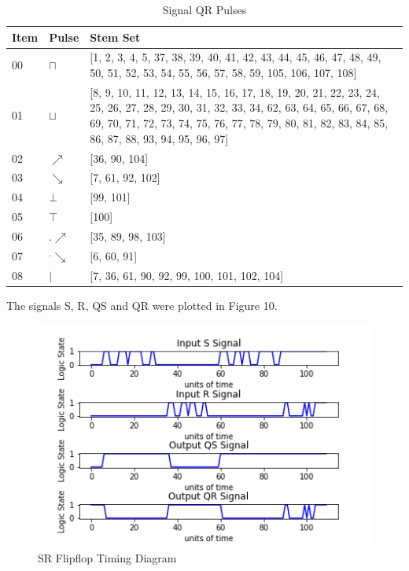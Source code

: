 \documentclass[10pt,journal]{IEEEtran}
\begin{document}
\begin{table}[H] \caption{Signal QR Pulses}\centering\begin{tabular}{|p{.4cm}|p{.5cm}|p{6.5cm}|}\hline Item&Pulse &Stem Set\\ \hline 00& \footnotesize$\sqcap$ & \footnotesize[1, 2, 3, 4, 5, 37, 38, 39, 40, 41, 42, 43, 44, 45, 46, 47, 48, 49, 50, 51, 52, 53, 54, 55, 56, 57, 58, 59, 105, 106, 107, 108]\\ \hline 01& \footnotesize$\sqcup$ & \footnotesize[8, 9, 10, 11, 12, 13, 14, 15, 16, 17, 18, 19, 20, 21, 22, 23, 24, 25, 26, 27, 28, 29, 30, 31, 32, 33, 34, 62, 63, 64, 65, 66, 67, 68, 69, 70, 71, 72, 73, 74, 75, 76, 77, 78, 79, 80, 81, 82, 83, 84, 85, 86, 87, 88, 93, 94, 95, 96, 97]\\ \hline 02& \footnotesize$\nearrow$ & \footnotesize[36, 90, 104]\\ \hline 03& \footnotesize$\searrow$ & \footnotesize[7, 61, 92, 102]\\ \hline 04& \footnotesize$\bot$ & \footnotesize[99, 101]\\ \hline 05& \footnotesize$\top$ & \footnotesize[100]\\ \hline 06& \footnotesize$.\nearrow$ & \footnotesize[35, 89, 98, 103]\\ \hline 07& \footnotesize$^.\searrow$ & \footnotesize[6, 60, 91]\\ \hline 08& \footnotesize$|$ & \footnotesize[7, 36, 61, 90, 92, 99, 100, 101, 102, 104]\\ \hline \end{tabular} \end{table} 
The signals S, R, QS and QR were plotted in Figure 10.
\begin{figure}[H]
\centering\includegraphics[width=1\linewidth,height=0.35\textheight]{FG010.png}
\caption{SR Flipflop Timing Diagram}
\label{fig:FG010.png}
\end{figure}
\end{document}
